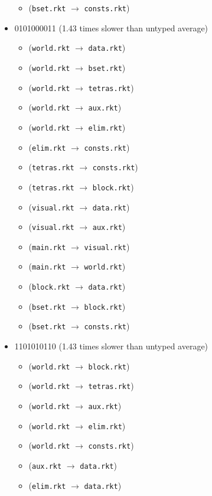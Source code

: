 \documentclass{article}
\newcommand{\mono}[1]{\texttt{#1}}
\begin{document}
\begin{itemize}
\begin{itemize}
  \item (\mono{bset.rkt} $\rightarrow$ \mono{consts.rkt})
  \end{itemize}
\item 0101000011 (1.43 times slower than untyped average)
  \begin{itemize}
  \item (\mono{world.rkt} $\rightarrow$ \mono{data.rkt})
  \item (\mono{world.rkt} $\rightarrow$ \mono{bset.rkt})
  \item (\mono{world.rkt} $\rightarrow$ \mono{tetras.rkt})
  \item (\mono{world.rkt} $\rightarrow$ \mono{aux.rkt})
  \item (\mono{world.rkt} $\rightarrow$ \mono{elim.rkt})
  \item (\mono{elim.rkt} $\rightarrow$ \mono{consts.rkt})
  \item (\mono{tetras.rkt} $\rightarrow$ \mono{consts.rkt})
  \item (\mono{tetras.rkt} $\rightarrow$ \mono{block.rkt})
  \item (\mono{visual.rkt} $\rightarrow$ \mono{data.rkt})
  \item (\mono{visual.rkt} $\rightarrow$ \mono{aux.rkt})
  \item (\mono{main.rkt} $\rightarrow$ \mono{visual.rkt})
  \item (\mono{main.rkt} $\rightarrow$ \mono{world.rkt})
  \item (\mono{block.rkt} $\rightarrow$ \mono{data.rkt})
  \item (\mono{bset.rkt} $\rightarrow$ \mono{block.rkt})
  \item (\mono{bset.rkt} $\rightarrow$ \mono{consts.rkt})
  \end{itemize}
\item 1101010110 (1.43 times slower than untyped average)
  \begin{itemize}
  \item (\mono{world.rkt} $\rightarrow$ \mono{block.rkt})
  \item (\mono{world.rkt} $\rightarrow$ \mono{tetras.rkt})
  \item (\mono{world.rkt} $\rightarrow$ \mono{aux.rkt})
  \item (\mono{world.rkt} $\rightarrow$ \mono{elim.rkt})
  \item (\mono{world.rkt} $\rightarrow$ \mono{consts.rkt})
  \item (\mono{aux.rkt} $\rightarrow$ \mono{data.rkt})
  \item (\mono{elim.rkt} $\rightarrow$ \mono{data.rkt})

\end{itemize}
\end{itemize}
\end{document}
